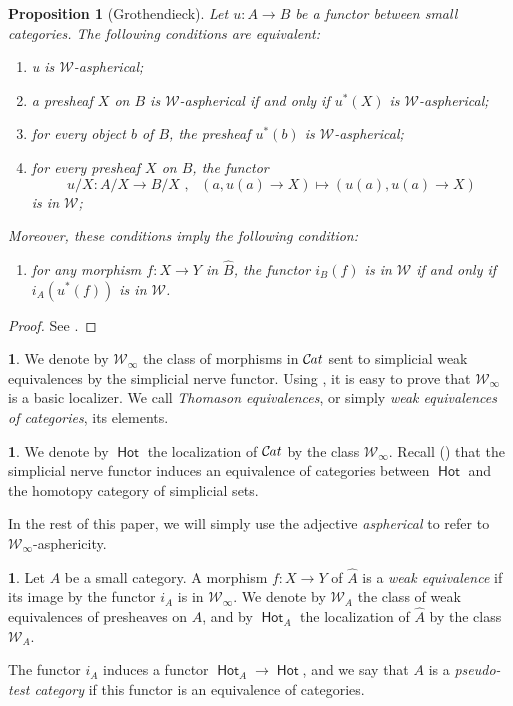 \documentclass[10pt, english, a4paper, nothms]{amsart}
\theoremstyle{plain}
\newtheorem{prop}[theorem]{Proposition}
\theoremstyle{remark}
\theoremstyle{definition}
\newtheorem{paragr}[theorem]{}
\numberwithin{equation}{theorem}
\newcommand{\Cat}{{\mathcal{C}\mspace{-2.mu}\it{at}}}
\newcommand{\pref}[1]{{\widehat{ #1 }}}
\newcommand{\tranche}[2]{#1/{#2}}
\newcommand{\W}{\mathcal{W}}
\newcommand{\Hot}{\operatorname{\mathsf{Hot}}}
\newcommand{\mdvirg}{\text{ ,}\hspace{10pt}}
\begin{document}
\begin{prop}[Grothendieck]\label{prop:MorphismesAspheriquesLocFond}
Let $u:A\to B$ be a functor between small categories. The following
conditions are equivalent:
\begin{enumerate}
\item u is $\W$-aspherical;
\item a presheaf $X$ on $B$ is $\W$-aspherical if and only if $u^*(X)$ is
$\W$-aspherical;
\item for every object $b$ of $B$, the presheaf $u^*(b)$ is $\W$-aspherical;
\item for every presheaf $X$ on $B$, the functor
\[
  \tranche{u}{X}: \tranche{A}{X}\to \tranche{B}{X} \mdvirg (a, u(a) \rightarrow X)
  \mapsto (u(a), u(a) \rightarrow X)
  \]
  is in $\W$;
\end{enumerate}

Moreover, these conditions imply the following condition:
\begin{enumerate}[resume]
\item for any morphism $f: X \to Y$ in $\pref{B}$, the functor
$i_B(f)$ is in $\W$ if and only if $i_A(u^*(f))$ is in $\W$.
\end{enumerate}
\end{prop}
\begin{proof}
See \cite[Proposition 1.2.9]{maltsiniotis2005}.
\end{proof}

\begin{paragr}
\label{def:eqThomason} 
We denote by $\W_\infty$ the class of morphisms in $\Cat$ sent to
simplicial weak equivalences by the simplicial nerve functor. Using
\cite[Theorem A]{quillenktheory}, it is easy to prove that $\W_\infty$ is a basic
localizer. We call \emph{Thomason equivalences}, or simply \emph{weak
equivalences of categories}, its elements. 
\end{paragr}
\begin{paragr}
We denote by $\Hot$ the localization of $\Cat$ by the class $\W_\infty$. Recall
(\cite[VI, Theorem 3.3]{illusie1971cotangent}) that the simplicial nerve functor
induces an equivalence of categories between $\Hot$ and the homotopy category of
simplicial sets. 
\end{paragr}

In the rest of this paper, we will simply use the adjective \emph{aspherical}
to refer to $\W_\infty$-asphericity.

\begin{paragr}
Let $A$ be a small category. A morphism $f: X \to Y$ of $\pref{A}$ is a \emph{weak
equivalence} if its image by the functor $i_A$ is in $\W_\infty$. We
denote by $\W_A$ the class of weak equivalences of presheaves on $A$,
and by $\Hot_A$ the localization of $\pref{A}$ by the class $\W_A$.

The functor $i_A$ induces a functor $\Hot_A \to \Hot$, and we say that
$A$ is a \emph{pseudo-test category} if this functor is an equivalence of
categories. 
\end{paragr}
\end{document}
